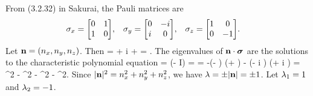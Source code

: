 \begin{solution}
	From (3.2.32) in Sakurai, the Pauli matrices are
	\begin{align} \label{pauli}
		\sigx &= \mqty[ 0 & 1 \\ 1 & 0 ], &
		\sigy &= \mqty[ 0 & -i \\ i & 0 ], &
		\sigz &= \mqty[ 1 & 0 \\ 0 & -1 ].
	\end{align}
	Let $\mathbf{n} = (n_x, n_y, n_z)$.  Then
	\beqn \label{ndsmat}
		\nds = \mqty[ 0 & \nx \\ \nx & 0 ] + i \mqty[ 0 & -\ny \\ \ny & 0 ] + \mqty[ \nz & 0 \\ 0 & -\nz ]
		= \mqty[ \nz & \nx - i \ny \\ \nx + i \ny & -\nz ].
	\eeqn
	The eigenvalues of $\mathbf{n} \cdot \boldsymbol{\sigma}$ are the solutions to the characteristic polynomial equation
	 = \det(\nds - \lam I)
		= 
		= -(\nz - \lam) (\nz + \lam) - (\nx - i \ny) (\nx + i \ny)
		= \lam^2 - \nx^2 - \ny^2 - \nz^2.
	\eeq
	Since $|\mathbf{n}|^2 = n_x^2 + n_y^2 + n_z^2$, we have $\lambda = \pm |\mathbf{n}| = \pm 1$.  Let $\lambda_1 = 1$ and $\lambda_2 = -1$.
	

\end{solution}
